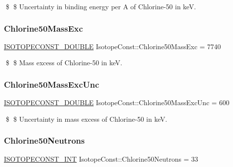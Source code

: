 \$ \$ Uncertainty in binding energy per A of Chlorine-\/50 in keV. \mbox{\label{group___isotope_const-_chlorine-_cl50_ga268c8992f1d5bc4b052e51447101b520}} 
\subsubsection{\texorpdfstring{Chlorine50\+Mass\+Exc}{Chlorine50MassExc}}
{\footnotesize\ttfamily \mbox{\hyperlink{group___isotope_const-_macros_ga8f45a7272ce02c0b4c65c44636ed719a}{I\+S\+O\+T\+O\+P\+E\+C\+O\+N\+S\+T\+\_\+\+D\+O\+U\+B\+LE}} Isotope\+Const\+::\+Chlorine50\+Mass\+Exc = 7740}

\$ \$ Mass excess of Chlorine-\/50 in keV. \mbox{\label{group___isotope_const-_chlorine-_cl50_gad1312eb6484e36707948a70db316cf09}} 
\subsubsection{\texorpdfstring{Chlorine50\+Mass\+Exc\+Unc}{Chlorine50MassExcUnc}}
{\footnotesize\ttfamily \mbox{\hyperlink{group___isotope_const-_macros_ga8f45a7272ce02c0b4c65c44636ed719a}{I\+S\+O\+T\+O\+P\+E\+C\+O\+N\+S\+T\+\_\+\+D\+O\+U\+B\+LE}} Isotope\+Const\+::\+Chlorine50\+Mass\+Exc\+Unc = 600}

\$ \$ Uncertainty in mass excess of Chlorine-\/50 in keV. \mbox{\label{group___isotope_const-_chlorine-_cl50_ga199f6c800e159cabc59f306377639cd0}} 
\subsubsection{\texorpdfstring{Chlorine50\+Neutrons}{Chlorine50Neutrons}}
{\footnotesize\ttfamily \mbox{\hyperlink{group___isotope_const-_macros_ga5f18360b3e99483a35c32d789e62621c}{I\+S\+O\+T\+O\+P\+E\+C\+O\+N\+S\+T\+\_\+\+I\+NT}} Isotope\+Const\+::\+Chlorine50\+Neutrons = 33}

